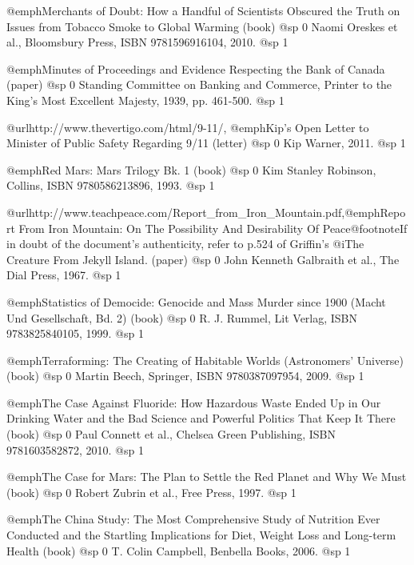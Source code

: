 \item
@emph{Merchants of Doubt: How a Handful of Scientists Obscured the Truth on Issues from Tobacco Smoke to Global Warming} (book)
@sp 0
Naomi Oreskes et al., Bloomsbury Press, ISBN 9781596916104, 2010.
@sp 1

\item
@emph{Minutes of Proceedings and Evidence Respecting the Bank of Canada} (paper)
@sp 0
Standing Committee on Banking and Commerce, Printer to the King's Most Excellent Majesty, 1939, pp. 461-500.
@sp 1

\item
@url{http://www.thevertigo.com/html/9-11/, @emph{Kip's Open Letter to Minister of Public Safety Regarding 9/11}} (letter)
@sp 0
Kip Warner, 2011.
@sp 1

\item
@emph{Red Mars: Mars Trilogy Bk. 1} (book)
@sp 0
Kim Stanley Robinson, Collins, ISBN 9780586213896, 1993.
@sp 1

\item
@url{http://www.teachpeace.com/Report_from_Iron_Mountain.pdf,@emph{Report From Iron Mountain: On The Possibility And Desirability Of Peace}}@footnote{If in doubt of the document's authenticity, refer to p.524 of Griffin's @i{The Creature From Jekyll Island}.} (paper)
@sp 0
John Kenneth Galbraith et al., The Dial Press, 1967.
@sp 1

\item
@emph{Statistics of Democide: Genocide and Mass Murder since 1900 (Macht Und Gesellschaft, Bd. 2)} (book)
@sp 0
R. J. Rummel, Lit Verlag, ISBN 9783825840105, 1999.
@sp 1

\item
@emph{Terraforming: The Creating of Habitable Worlds (Astronomers' Universe)} (book)
@sp 0
Martin Beech, Springer, ISBN 9780387097954, 2009.
@sp 1

\item
@emph{The Case Against Fluoride: How Hazardous Waste Ended Up in Our Drinking Water and the Bad Science and Powerful Politics That Keep It There} (book)
@sp 0
Paul Connett et al., Chelsea Green Publishing, ISBN 9781603582872, 2010.
@sp 1

\item
@emph{The Case for Mars: The Plan to Settle the Red Planet and Why We Must} (book)
@sp 0
Robert Zubrin et al., Free Press, 1997.
@sp 1

\item
@emph{The China Study: The Most Comprehensive Study of Nutrition Ever Conducted and the Startling Implications for Diet, Weight Loss and Long-term Health} (book)
@sp 0
T. Colin Campbell, Benbella Books, 2006.
@sp 1

